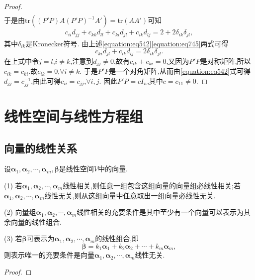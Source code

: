 \documentclass[lang=cn,newtx,10pt,scheme=chinese]{elegantbook}
\begin{document}
\begin{proof}
\begin{align*}
\end{align*}
于是由$\text{tr}((P'P)A(P'P)^{-1}A')=\text{tr}(AA')$可知
\begin{align}\label{equation:eq745}
c_{ii}d_{jj}+c_{kk}d_{ll}+c_{ki}d_{jl}+c_{ik}d_{lj}=2 + 2\delta_{ik}\delta_{jl},  
\end{align}
其中\(\delta_{ik}\)是Kronecker符号. 由上述\eqref{equation:eq542}\eqref{equation:eq745}两式可得
\[
c_{ki}d_{jl}+c_{ik}d_{lj}=2\delta_{ik}\delta_{jl}.
\]
在上式中令\(j = l\),\(i\neq k\),注意到\(d_{jj}\neq0\),故有\(c_{ik}+c_{ki}=0\),又因为\(P'P\)是对称矩阵,所以\(c_{ik}=c_{ki}\).故\(c_{ik}=0\),\(\forall i\neq k\). 于是\(P'P\)是一个对角矩阵,从而由\eqref{equation:eq542}式可得\(d_{jj}=c_{jj}^{-1}\),由此可得\(c_{ii}=c_{jj}\),\(\forall i,j\). 因此\(P'P = cI_n\),其中\(c = c_{11}\neq0\).
\end{proof}




\chapter{线性空间与线性方程组}

\section{向量的线性关系}

\begin{theorem}\label{theorem:向量的线性关系定理1}
设\(\boldsymbol{\alpha}_1,\boldsymbol{\alpha}_2,\cdots,\boldsymbol{\alpha}_m,\boldsymbol{\beta}\)是线性空间\(V\)中的向量.

(1) 若\(\boldsymbol{\alpha}_1,\boldsymbol{\alpha}_2,\cdots,\boldsymbol{\alpha}_m\)线性相关,则任意一组包含这组向量的向量组必线性相关;若\(\boldsymbol{\alpha}_1,\boldsymbol{\alpha}_2,\cdots,\boldsymbol{\alpha}_m\)线性无关,则从这组向量中任意取出一组向量必线性无关.

(2) 向量组\(\boldsymbol{\alpha}_1,\boldsymbol{\alpha}_2,\cdots,\boldsymbol{\alpha}_m\)线性相关的充要条件是其中至少有一个向量可以表示为其余向量的线性组合.

(3) 若\(\boldsymbol{\beta}\)可表示为\(\boldsymbol{\alpha}_1,\boldsymbol{\alpha}_2,\cdots,\boldsymbol{\alpha}_m\)的线性组合,即
\[
\boldsymbol{\beta}=k_1\boldsymbol{\alpha}_1 + k_2\boldsymbol{\alpha}_2+\cdots + k_m\boldsymbol{\alpha}_m,
\]
则表示唯一的充要条件是向量\(\boldsymbol{\alpha}_1,\boldsymbol{\alpha}_2,\cdots,\boldsymbol{\alpha}_m\)线性无关.
\end{theorem}
\begin{proof}

\end{proof}
\end{document}

